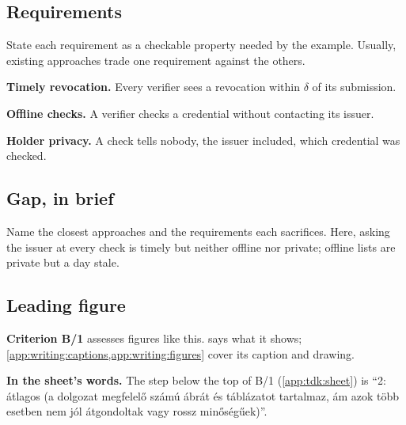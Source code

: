 \subsection[Requirements]{Requirements\skimmark}\label{app:chapters:requirements}
State each requirement as a checkable property needed by the example. Usually, existing approaches trade one requirement against the others.
\begin{requirements}
  \item\label{req:guide:timely} \textbf{Timely revocation.} Every verifier sees a revocation within $\delta$ of its submission.
  \item\label{req:guide:offline} \textbf{Offline checks.} A verifier checks a credential without contacting its issuer.
  \item\label{req:guide:private} \textbf{Holder privacy.} A check tells nobody, the issuer included, which credential was checked.
\end{requirements}

\subsection{Gap, in brief}\label{app:chapters:introgap}
Name the closest approaches and the requirements each sacrifices. Here, asking the issuer at every check is timely but neither offline nor private; offline lists are private but a day stale.

\subsection[Leading figure]{Leading figure\skimmark}\label{app:chapters:leading-figure}
\textbf{Criterion B/1} assesses figures like this.  says what it shows; \cref{app:writing:captions,app:writing:figures} cover its caption and drawing.

\textbf{In the sheet's words.} The step below the top of B/1 (\cref{app:tdk:sheet}) is \enquote{2: átlagos (a dolgozat megfelelő számú ábrát és táblázatot tartalmaz, ám azok több esetben nem jól átgondoltak vagy rossz minőségűek)}.

